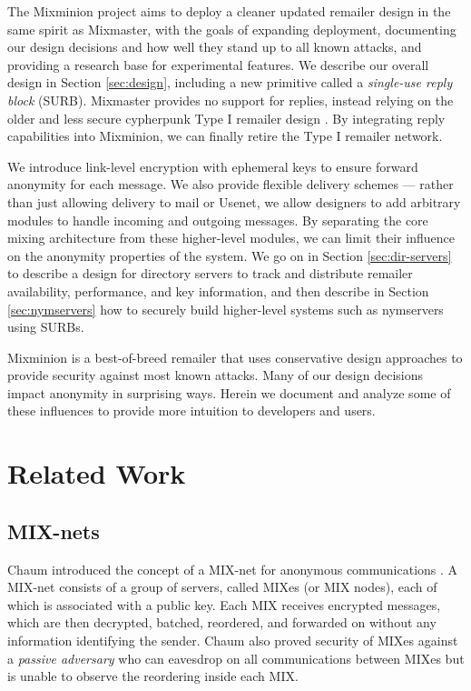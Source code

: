 \documentclass{llncs}
\begin{document}
The Mixminion project aims to deploy a cleaner updated remailer design
in the same spirit as Mixmaster, with the goals of expanding deployment,
documenting our design decisions and how well they stand up to all known
attacks, and providing a research base for experimental features. We
describe our overall design in Section \ref{sec:design}, including
a new primitive called a \emph{single-use reply block}
(SURB).  Mixmaster provides no support for replies, instead relying
on the older and less secure cypherpunk Type I remailer design
\cite{remailer-history}. By integrating reply capabilities into
Mixminion, we can finally retire the Type I remailer network.

We introduce link-level encryption with ephemeral keys to ensure forward
anonymity for each message. We also provide flexible delivery schemes ---
rather than just allowing delivery to mail or Usenet, we allow designers
to add arbitrary modules to handle incoming and outgoing messages. By
separating the core mixing architecture from these higher-level modules,
we can limit their influence on the anonymity properties of the system. We
go on in Section \ref{sec:dir-servers} to describe a design for directory
servers to track and distribute remailer availability, performance,
and key information, and then describe in Section \ref{sec:nymservers}
how to securely build higher-level systems such as nymservers using SURBs.

Mixminion is a best-of-breed remailer that uses conservative
design approaches to provide security against most known attacks.
Many of our design decisions impact anonymity in surprising ways. Herein
we document and analyze some of these influences to provide more intuition
to developers and users.




\section{Related Work}

\subsection{MIX-nets}

Chaum introduced the concept of a MIX-net for anonymous communications
\cite{chaum-mix}. A MIX-net consists of a group of servers, called MIXes
(or MIX nodes), each of which is associated with a public key. Each
MIX receives encrypted messages, which are then decrypted, batched,
reordered, and forwarded on without any information identifying the
sender. Chaum also proved security of MIXes against a \emph{passive
adversary} who can eavesdrop on all communications between MIXes but is
unable to observe the reordering inside each MIX.
\end{document}
